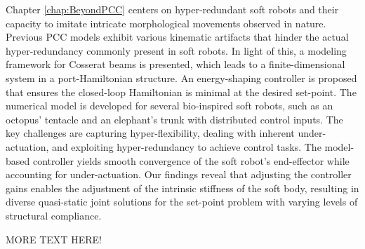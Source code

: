 Chapter \ref{chap:BeyondPCC} centers on hyper-redundant soft robots and their capacity to imitate intricate morphological movements observed in nature. Previous PCC models exhibit various kinematic artifacts that hinder the actual hyper-redundancy commonly present in soft robots. In light of this, a modeling framework for Cosserat beams is presented, which leads to a finite-dimensional system in a port-Hamiltonian structure. An energy-shaping controller is proposed that ensures the closed-loop Hamiltonian is minimal at the desired set-point. The numerical model is developed for several bio-inspired soft robots, such as an octopus' tentacle and an elephant's trunk with distributed control inputs. The key challenges are capturing hyper-flexibility, dealing with inherent under-actuation, and exploiting hyper-redundancy to achieve control tasks. The model-based controller yields smooth convergence of the soft robot's end-effector while accounting for under-actuation. Our findings reveal that adjusting the controller gains enables the adjustment of the intrinsic stiffness of the soft body, resulting in diverse quasi-static joint solutions for the set-point problem with varying levels of structural compliance. 

MORE TEXT HERE! \\[0.02em]

